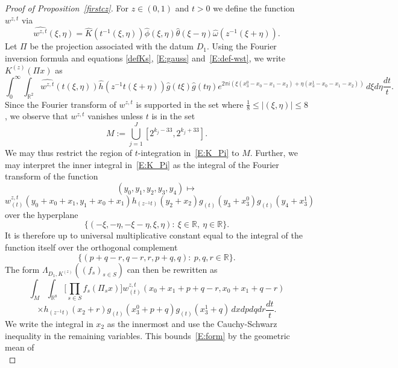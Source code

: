 \documentclass[12pt,reqno]{amsart}
\theoremstyle{plain}
\theoremstyle{definition}
\numberwithin{equation}{section}
\newcommand{\R}{{\mathbb R}}
\def\wh{\widehat}
\begin{document}
\begin{proof}[Proof of Proposition~\ref{firstcz}]
For $z\in (0,1)$ and $t>0$ we define the function $w^{z,t}$ via
\begin{equation}\label{E:def-wst}
\wh{w^{z,t}}(\xi,\eta)= \wh{K}(t^{-1}(\xi,\eta))\wh{\phi}(\xi,\eta)\wh{\theta}(\xi-\eta) \wh{\omega} (z^{-1}(\xi+\eta)).
\end{equation}
Let $\Pi$ be the projection associated with the datum $D_1$. Using the Fourier inversion formula and equations \eqref{defKs}, \eqref{E:gauss} and~\eqref{E:def-wst}, we write ${K^{(z)}}(\Pi x)$ as
\begin{equation}\label{E:K_Pi}
\int_0^\infty \int_{\R^2}   \wh{w^{z,t}}(t(\xi,\eta))
\wh{h}(z^{-1}t(\xi+\eta))
\wh{g}(t\xi) \wh{g}(t\eta) 
e^{2\pi i( \xi (x_3^0-x_0-x_1-x_2)+\eta(x_3^1-x_0-x_1-x_2))}\,d\xi d\eta \frac{dt}{t}.
\end{equation}
Since the Fourier transform of $w^{z,t}$ is supported in the set where $\frac{1}{8} \leq |(\xi,\eta)| \leq 8$, we observe that $w^{z,t}$ vanishes unless $t$ is in the set
$$ M:= \bigcup_{j=1}^J [2^{k_j-33} , 2^{k_j+33}].$$
We may thus restrict the region of  $t$-integration in~\eqref{E:K_Pi} to $M$.
Further, we may interpret the inner integral in~\eqref{E:K_Pi} as the integral of the Fourier transform of the function 
\begin{equation*}
(y_0,y_1,y_2,y_3,y_4) \mapsto
\end{equation*}
\begin{equation*}w^{z,t}_{(t)}(y_0+x_0+x_1,y_1+x_0+x_1)h_{(z^{-1}t)}(y_2+x_2)
g_{(t)}(y_3+x_3^0) 
g_{(t)}(y_4+x_3^1)   
\end{equation*}
over the hyperplane
$$
\{(-\xi,-\eta,-\xi-\eta,\xi,\eta):~\xi \in \R, ~\eta \in\R\}.
$$
It is therefore up to universal multiplicative constant equal to the integral of the function itself over the orthogonal complement
$$
\{(p+q-r,q-r,r,p+q,q):~p, q, r\in \R\}.
$$
The form $\Lambda_{D_1,K^{(z)}}((f_s)_{s\in S})$ can then be rewritten as
\begin{equation}\label{E:form}
\int_M \int_{\R^8}  \Big[\prod_{s\in S} f_s(\Pi_s x)\Big] 
w^{z,t}_{(t)}(x_0+x_1+p+q-r, x_0+x_1+q-r) 
\end{equation}
\begin{equation*}
\times h_{(z^{-1}t)}(x_2+r) g_{(t)}(x_3^0+p+q)
g_{(t)}(x_3^1+q) 
\,dx dp dq dr \frac{dt}{t}.
\end{equation*}
 We write the integral in $x_2$ as the innermost and use the Cauchy-Schwarz inequality in the remaining variables. This bounds~\eqref{E:form} by the geometric mean of
\begin{equation}\label{E:second-term}

\end{equation}
\end{proof}
\end{document}

